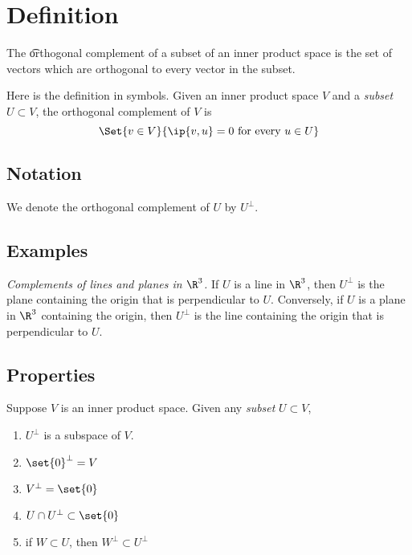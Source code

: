 
\section*{Definition}

The \t{orthogonal complement} of a subset of an inner product space is the set of vectors which are orthogonal to every vector in the subset.

Here is the definition in symbols.
Given an inner product space $V$ and a \textit{subset} $U \subset V$, the orthogonal complement of $V$ is
\[
\Set{v \in V}{\ip{v, u} = 0 \text{ for every } u \in U}
\]

\subsection*{Notation}

We denote the orthogonal complement of $U$ by $U^{\perp}$.

\subsection*{Examples}

\textit{Complements of lines and planes in $\R ^3$.}
If $U$ is a line in $\R ^3$, then $U^\perp $ is the plane containing the origin that is perpendicular to $U$.
Conversely, if $U$ is a plane in $\R ^3$ containing the origin, then $U^\perp $ is the line containing the origin that is perpendicular to $U$.

\subsection*{Properties}

\begin{proposition}
Suppose $V$ is an inner product space.
Given any \textit{subset} $U \subset V$,
  \begin{enumerate}
    \item $U^\perp $ is a subspace of $V$.
    \item $\set{0}^\perp  = V$
    \item $V^\perp  = \set{0}$
    \item $U \cap  U^\perp  \subset \set{0}$
    \item if $W \subset U$, then $W^\perp  \subset U^\perp $
  \end{enumerate}
\end{proposition}

\blankpage